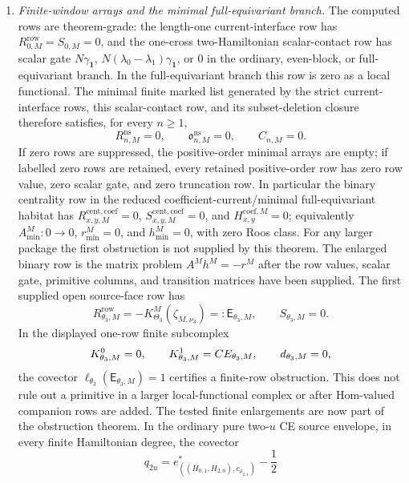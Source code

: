 \begin{stmt}
\begin{enumerate}[label=(\arabic*)]
    \item \emph{Finite-window arrays and the minimal full-equivariant
    branch.}  The computed rows are theorem-grade: the length-one
    current-interface row has \(R^{\mathrm{row}}_{0,M}=S_{0,M}=0\), and
    the one-cross two-Hamiltonian scalar-contact row has scalar gate
    \(N\gamma_{\mathbf 1}\), \(N(\lambda_0-\lambda_1)\gamma_{\mathbf 1}\),
    or \(0\) in the ordinary, even-block, or full-equivariant branch.  In
    the full-equivariant branch this row is zero as a local functional.
    The minimal finite marked list generated by the strict
    current-interface rows, this scalar-contact row, and its
    subset-deletion closure therefore satisfies, for every \(n\geq1\),
    \[
      R^{\mathrm{ns}}_{n,M}=0,\qquad
      \mathfrak o^{\mathrm{ns}}_{n,M}=0,\qquad
      C_{n,M}=0 .
    \]
    If zero rows are suppressed, the positive-order minimal arrays are
    empty; if labelled zero rows are retained, every retained
    positive-order row has zero row value, zero scalar gate, and zero
    truncation row.  In particular the binary centrality row in the
    reduced coefficient-current/minimal full-equivariant habitat has
    \(R^{\mathrm{cent},\mathrm{coef}}_{x,y,M}=0\),
    \(S^{\mathrm{cent},\mathrm{coef}}_{x,y,M}=0\), and
    \(H^{\mathrm{coef},M}_{x,y}=0\); equivalently
    \(A^M_{\min}:0\to0\), \(r^M_{\min}=0\), and \(h^M_{\min}=0\), with
    zero Roos class.  For any larger package the first obstruction is not
    supplied by this theorem.  The enlarged binary row is the matrix
    problem \(A^Mh^M=-r^M\) after the row values, scalar gate, primitive
    columns, and transition matrices have been supplied.  The first
    supplied open source-face row has
    \[
      R^{\mathrm{row}}_{\theta_3,M}
      =
      -K^M_{\Theta_3}(\zeta_{M,\nu_3})
      =:\mathsf E_{\theta_3,M},
      \qquad
      S_{\theta_3,M}=0 .
    \]
    In the displayed one-row finite subcomplex
    \[
      K^0_{\theta_3,M}=0,\qquad
      K^1_{\theta_3,M}=CE_{\theta_3,M},
      \qquad
      d_{\theta_3,M}=0,
    \]
    the covector
    \(\ell_{\theta_3}(\mathsf E_{\theta_3,M})=1\) certifies a finite-row
    obstruction.  This does not rule out a primitive in a larger
    local-functional complex or after Hom-valued companion rows are added.
    The tested finite enlargements are now part of the obstruction
    theorem.  In the ordinary pure two-\(u\) CE source envelope, in every
    finite Hamiltonian degree, the covector
    \[
      q_{2u}
      =
      e^*_{((H_{0,1},H_{2,0}),c_{\rho_{2,1}})}
      -\frac12
\]
\end{enumerate}
\end{stmt}
